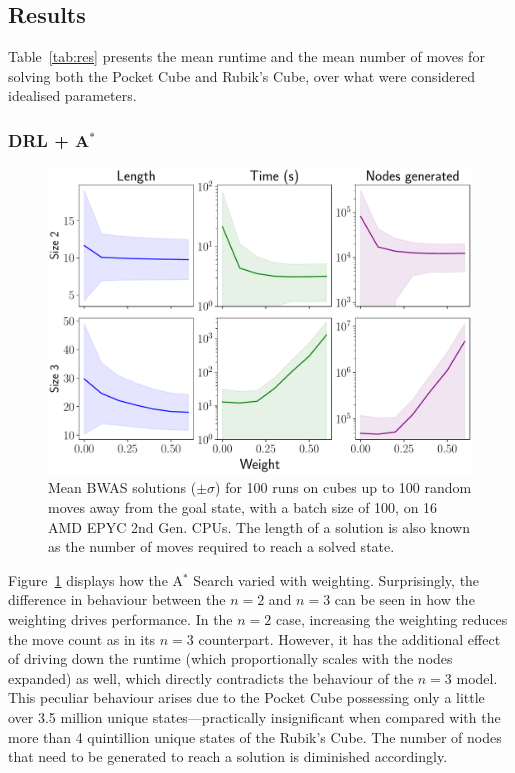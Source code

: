 \documentclass[UKenglish]{libraries/svproc}
\begin{document}
\subsection{Results}

Table~\ref{tab:res} presents the mean runtime and the mean number of moves for solving both the Pocket Cube and Rubik's Cube, over what were considered idealised parameters.



\subsubsection{DRL + A$^{\ast}$}

\begin{figure}
\centering
\includegraphics[width=0.8\linewidth]{images/bwas}
\caption{Mean BWAS solutions ($\pm\sigma$) for 100 runs on cubes up to 100 random moves away from the goal state, with a batch size of 100, on 16 AMD EPYC 2nd Gen. CPUs. The length of a solution is also known as the number of moves required to reach a solved state.}
\label{fig:fig3}
\end{figure}

Figure~\ref{fig:fig3} displays how the A$^{\ast}$ Search varied with weighting. Surprisingly, the difference in behaviour between the $n=2$ and $n=3$ can be seen in how the weighting drives performance. In the $n=2$ case, increasing the weighting reduces the move count as in its $n=3$ counterpart. However, it has the additional effect of driving down the runtime (which proportionally scales with the nodes expanded) as well, which directly contradicts the behaviour of the $n=3$ model. This peculiar behaviour arises due to the Pocket Cube possessing only a little over 3.5 million unique states---practically insignificant when compared with the more than 4 quintillion unique states of the Rubik's Cube. The number of nodes that need to be generated to reach a solution is diminished accordingly.
\end{document}
